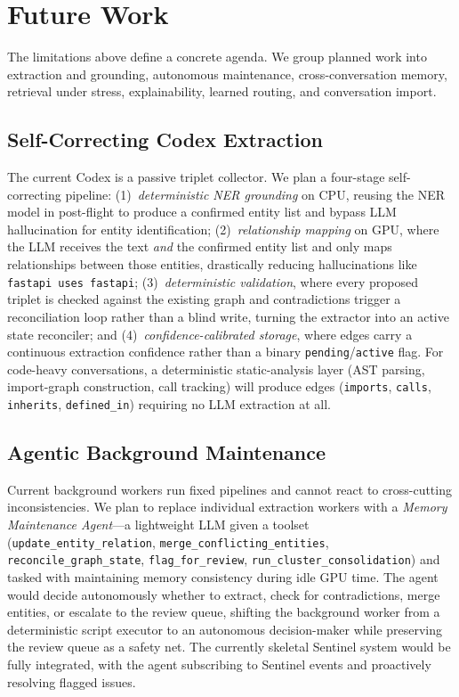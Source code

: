 \documentclass[11pt,a4paper]{article}
\begin{document}
\section{Future Work}
\label{sec:future-work}

The limitations above define a concrete agenda. We group planned work into extraction and grounding, autonomous maintenance, cross-conversation memory, retrieval under stress, explainability, learned routing, and conversation import.

\subsection{Self-Correcting Codex Extraction}
The current Codex is a passive triplet collector. We plan a four-stage self-correcting pipeline: (1)~\emph{deterministic NER grounding} on CPU, reusing the NER model in post-flight to produce a confirmed entity list and bypass LLM hallucination for entity identification; (2)~\emph{relationship mapping} on GPU, where the LLM receives the text \emph{and} the confirmed entity list and only maps relationships between those entities, drastically reducing hallucinations like \texttt{fastapi uses fastapi}; (3)~\emph{deterministic validation}, where every proposed triplet is checked against the existing graph and contradictions trigger a reconciliation loop rather than a blind write, turning the extractor into an active state reconciler; and (4)~\emph{confidence-calibrated storage}, where edges carry a continuous extraction confidence rather than a binary \texttt{pending}/\texttt{active} flag. For code-heavy conversations, a deterministic static-analysis layer (AST parsing, import-graph construction, call tracking) will produce edges (\texttt{imports}, \texttt{calls}, \texttt{inherits}, \texttt{defined\_in}) requiring no LLM extraction at all.

\subsection{Agentic Background Maintenance}
Current background workers run fixed pipelines and cannot react to cross-cutting inconsistencies. We plan to replace individual extraction workers with a \emph{Memory Maintenance Agent}---a lightweight LLM given a toolset (\texttt{update\_entity\_relation}, \texttt{merge\_conflicting\_entities}, \texttt{reconcile\_graph\_state}, \texttt{flag\_for\_review}, \texttt{run\_cluster\_consolidation}) and tasked with maintaining memory consistency during idle GPU time. The agent would decide autonomously whether to extract, check for contradictions, merge entities, or escalate to the review queue, shifting the background worker from a deterministic script executor to an autonomous decision-maker while preserving the review queue as a safety net. The currently skeletal Sentinel system would be fully integrated, with the agent subscribing to Sentinel events and proactively resolving flagged issues.
\end{document}
